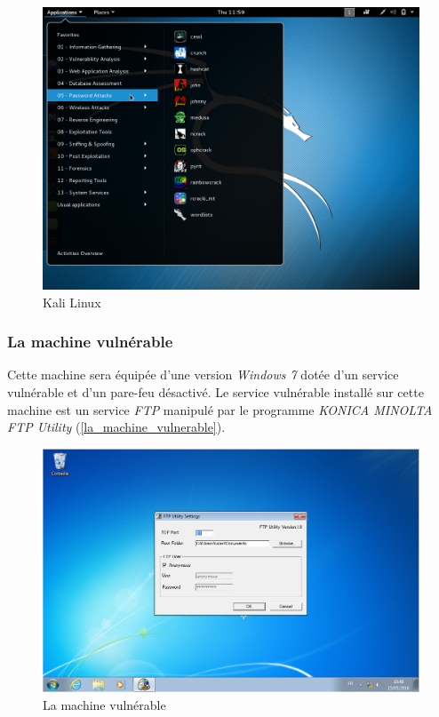     \begin{figure}[h!]
        \centering
        \includegraphics[width=\linewidth]{images/kali_linux.png}
        \caption{Kali Linux}
        \label{kali_linux}
    \end{figure}

    \subsubsection{La machine vulnérable} \label{machine_vulnerable} 
    Cette machine sera équipée d'une version \emph{Windows 7}  
    dotée d'un service vulnérable et d'un pare-feu désactivé. Le service vulnérable installé sur cette 
    machine est un service \emph{FTP} manipulé par le programme \emph{KONICA MINOLTA FTP Utility} 
    (\autoref{la_machine_vulnerable}). %
    \begin{figure}[h!]
        \centering
        \includegraphics[scale=0.3]{images/Windows_7_2.png}
        \caption{La machine vulnérable}
        \label{la_machine_vulnerable}
    \end{figure}

